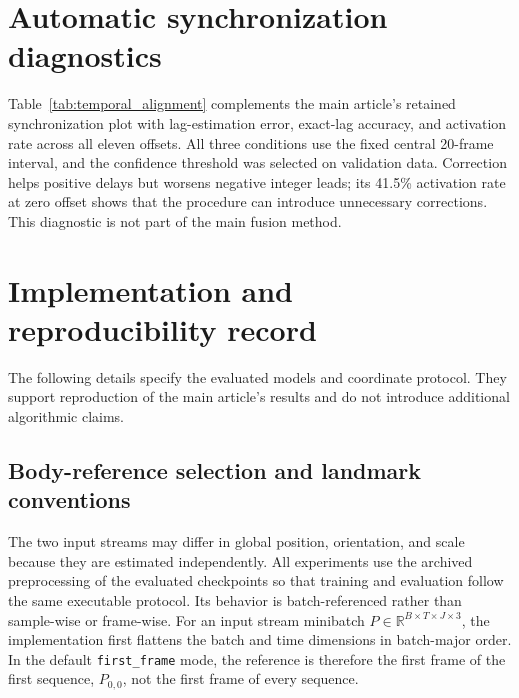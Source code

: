 \documentclass[11pt,letterpaper]{article}
\begin{document}
\section{Automatic synchronization diagnostics}
Table~\ref{tab:temporal_alignment} complements the main article's retained synchronization plot with lag-estimation error, exact-lag accuracy, and activation rate across all eleven offsets. All three conditions use the fixed central 20-frame interval, and the confidence threshold was selected on validation data. Correction helps positive delays but worsens negative integer leads; its 41.5\% activation rate at zero offset shows that the procedure can introduce unnecessary corrections. This diagnostic is not part of the main fusion method.

\FloatBarrier
\section{Implementation and reproducibility record}
\label{sec:implementation_record}
The following details specify the evaluated models and coordinate protocol. They support reproduction of the main article's results and do not introduce additional algorithmic claims.

\subsection{Body-reference selection and landmark conventions}


The two input streams may differ in global position, orientation, and scale because they are estimated independently. All experiments use the archived preprocessing of the evaluated checkpoints so that training and evaluation follow the same executable protocol. Its behavior is batch-referenced rather than sample-wise or frame-wise. For an input stream minibatch \(P\in\mathbb{R}^{B\times T\times J\times 3}\), the implementation first flattens the batch and time dimensions in batch-major order. In the default \texttt{first\_frame} mode, the reference is therefore the first frame of the first sequence, \(P_{0,0}\), not the first frame of every sequence.
\end{document}
